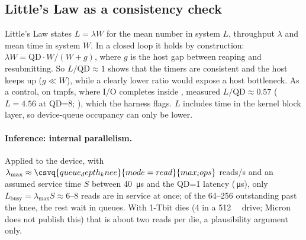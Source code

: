 \subsection{Little's Law as a consistency check}
Little's Law \cite{little1961proof} states $L=\lambda W$ for the mean number in system $L$, throughput
$\lambda$ and mean time in system $W$. In a closed loop it holds by construction:
$\lambda W = \text{QD}\cdot W/(W+g)$, where $g$ is the host gap between reaping and resubmitting. So
$L/\text{QD}\approx1$ shows that the timers are consistent and the host keeps up ($g\ll W$), while a
clearly lower ratio would expose a host bottleneck. As a control,  on tmpfs, where I/O
completes inside , measured $L/\text{QD}\approx0.57$ ($L=4.56$ at QD=8;
), which the harness flags. $L$ includes time in the
kernel block layer, so device-queue occupancy can only be lower.

\begin{table}[!htbp]
  \centering\small
  \caption{Little's Law per queue depth: $\lambda$ (IOPS) and $W$ (mean latency, \si{\micro\second}) are
  medians with the IQR in brackets; $L=\lambda W$ is computed per repetition and then summarized.
   random.}\label{tab:littles-law}
\end{table}

\paragraph{Inference: internal parallelism.} Applied to the device, with
$\lambda_{\max}\approx\csvq{queue_depth_knee}{mode=read}{max_iops}$ reads/s and an assumed service time $S$
between \qty{40}{\micro\second} and the QD=1 latency
(\,\si{\micro\second}), only
$L_\text{busy}=\lambda_{\max} S\approx 6$--$8$ reads are in service at once; of the 64--256 outstanding
past the knee, the rest wait in queues. With 1-Tbit dies (4 in a \qty{512}{\giga\byte} drive; Micron
does not publish this) that is about two reads per die, a plausibility argument only.

